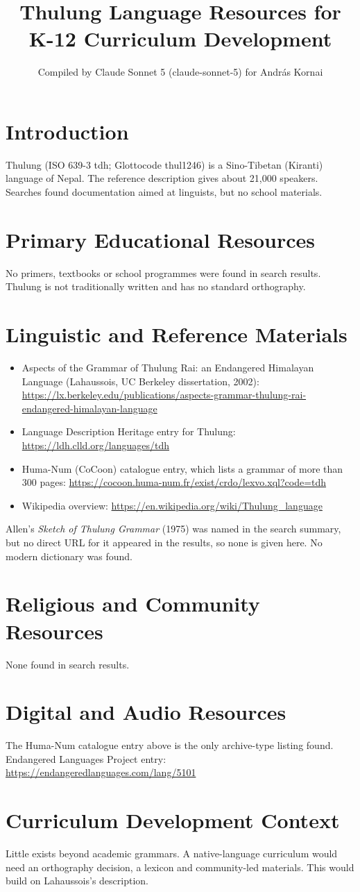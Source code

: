 \documentclass[12pt]{article}
\title{Thulung Language Resources for K-12 Curriculum Development}
\author{Compiled by Claude Sonnet 5 (claude-sonnet-5) for Andr\'as Kornai}
\date{}
\begin{document}
\maketitle
\section{Introduction}
Thulung (ISO 639-3 tdh; Glottocode thul1246) is a Sino-Tibetan (Kiranti) language of Nepal. The reference description gives about 21,000 speakers. Searches found documentation aimed at linguists, but no school materials.
\section{Primary Educational Resources}
No primers, textbooks or school programmes were found in search results. Thulung is not traditionally written and has no standard orthography.
\section{Linguistic and Reference Materials}
\begin{itemize}
\item Aspects of the Grammar of Thulung Rai: an Endangered Himalayan Language (Lahaussois, UC Berkeley dissertation, 2002): \url{https://lx.berkeley.edu/publications/aspects-grammar-thulung-rai-endangered-himalayan-language}
\item Language Description Heritage entry for Thulung: \url{https://ldh.clld.org/languages/tdh}
\item Huma-Num (CoCoon) catalogue entry, which lists a grammar of more than 300 pages: \url{https://cocoon.huma-num.fr/exist/crdo/lexvo.xql?code=tdh}
\item Wikipedia overview: \url{https://en.wikipedia.org/wiki/Thulung_language}
\end{itemize}
Allen's \emph{Sketch of Thulung Grammar} (1975) was named in the search summary, but no direct URL for it appeared in the results, so none is given here. No modern dictionary was found.
\section{Religious and Community Resources}
None found in search results.
\section{Digital and Audio Resources}
The Huma-Num catalogue entry above is the only archive-type listing found. Endangered Languages Project entry: \url{https://endangeredlanguages.com/lang/5101}
\section{Curriculum Development Context}
Little exists beyond academic grammars. A native-language curriculum would need an orthography decision, a lexicon and community-led materials. This would build on Lahaussois's description.
\end{document}
